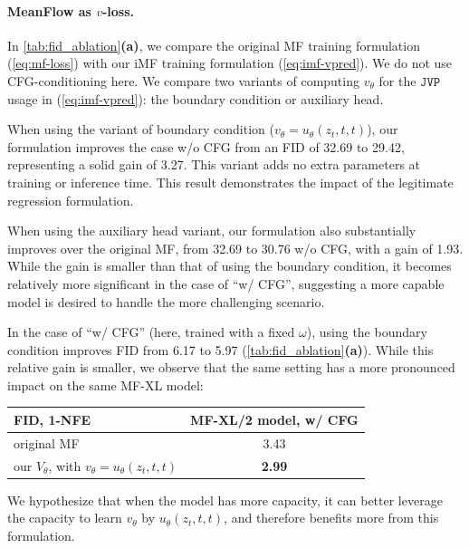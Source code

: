 \paragraph{MeanFlow as $v$-loss.}
In \cref{tab:fid_ablation}\textbf{(a)}, we compare the original MF training formulation (\ref{eq:mf-loss}) with our iMF training formulation (\ref{eq:imf-vpred}). 
We do not use CFG-conditioning here.
We compare two variants of computing $v_\theta$ for the $\mathtt{JVP}$ usage in (\ref{eq:imf-vpred}): the boundary condition or auxiliary head.

When using the variant of boundary condition  ($v_\theta = u_\theta(z_t,t,t)$), our formulation improves the case w/o CFG from an FID of 32.69 to 29.42, representing a solid gain of 3.27. This variant adds no extra parameters at training or inference time. This result demonstrates the impact of the legitimate regression formulation.

When using the auxiliary head variant, our formulation also substantially improves over the original MF, from 32.69 to 30.76 w/o CFG, with a gain of 1.93. While the gain is smaller than that of using the boundary condition, it becomes relatively more significant in the case of ``w/ CFG'', suggesting a more capable model is desired to handle the more challenging scenario.






In the case of ``w/ CFG'' (here, trained with a fixed $\omega$), using the boundary condition improves FID from 6.17 to 5.97 (\cref{tab:fid_ablation}\textbf{(a)}). While this relative gain is smaller, we observe that the same setting has a more pronounced impact on the same MF-XL model:
\begin{center}
\vspace{-.3em}
\centering\footnotesize
\begin{tabular}{y{120}|c}
\textbf{FID, 1-NFE} & \textbf{MF-XL/2 model}, w/ CFG \\
\hline
original MF~\cite{mf}     
    & 3.43 \\
our $V_\theta$, with $v_\theta = u_\theta(z_t,t,t)$       
    & \textbf{2.99} \\
\end{tabular}
\vspace{-.3em}
\end{center}
We hypothesize that when the model has more capacity, it can better leverage the capacity to learn $v_\theta$ by $u_\theta(z_t,t,t)$, and therefore benefits more from this formulation.

